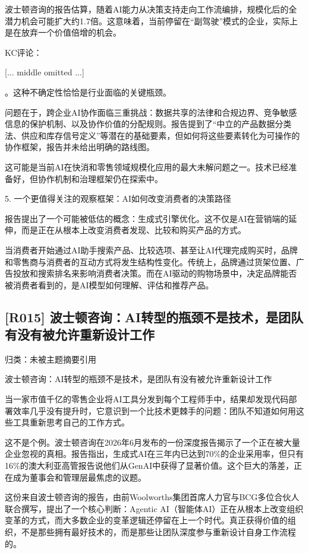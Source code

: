 \documentclass[11pt]{ctexart}
\begin{document}
波士顿咨询的报告估算，随着AI能力从决策支持走向工作流编排，规模化后的全潜力机会可能扩大约1.7倍。这意味着，当前停留在“副驾驶”模式的企业，实际上是在放弃一个价值倍增的机会。

KC评论： 

[... middle omitted ...]

。这种不确定性恰恰是行业面临的关键瓶颈。

问题在于，跨企业AI协作面临三重挑战：数据共享的法律和合规边界、竞争敏感信息的保护机制、以及协作价值的分配规则。报告提到了“中立的产品数据分类法、供应和库存信号定义”等潜在的基础要素，但如何将这些要素转化为可操作的协作框架，报告并未给出明确的路线图。

这可能是当前AI在快消和零售领域规模化应用的最大未解问题之一。技术已经准备好，但协作机制和治理框架仍在探索中。

5. 一个更值得关注的观察框架：AI如何改变消费者的决策路径

报告提出了一个可能被低估的概念：生成式引擎优化。这不仅是AI在营销端的延伸，而是正在从根本上改变消费者发现、比较和购买产品的方式。

当消费者开始通过AI助手搜索产品、比较选项、甚至让AI代理完成购买时，品牌和零售商与消费者的互动方式将发生结构性变化。传统上，品牌通过货架位置、广告投放和搜索排名来影响消费者决策。而在AI驱动的购物场景中，决定品牌能否被消费者看到的，是AI模型如何理解、评估和推荐产品。

\subsection{[R015] 波士顿咨询：AI转型的瓶颈不是技术，是团队有没有被允许重新设计工作}
{\small\color{refgray}归类：未被主题摘要引用}

波士顿咨询：AI转型的瓶颈不是技术，是团队有没有被允许重新设计工作

当一家市值千亿的零售企业将AI工具分发到每个工程师手中，结果却发现代码部署效率几乎没有提升时，它意识到一个比技术更棘手的问题：团队不知道如何用这些工具重新思考自己的工作方式。

这不是个例。波士顿咨询在2026年6月发布的一份深度报告揭示了一个正在被大量企业忽视的真相。报告指出，生成式AI在三年内已达到70\%的企业采用率，但只有16\%的澳大利亚高管报告说他们从GenAI中获得了显著价值。这个巨大的落差，正在成为董事会和管理层最焦虑的议题。

这份来自波士顿咨询的报告，由前Woolworths集团首席人力官与BCG多位合伙人联合撰写，提出了一个核心判断：Agentic AI（智能体AI）正在从根本上改变组织变革的方式，而大多数企业的变革逻辑还停留在上一个时代。真正获得价值的组织，不是那些拥有最好技术的，而是那些让团队深度参与重新设计自身工作流程的。
\end{document}
